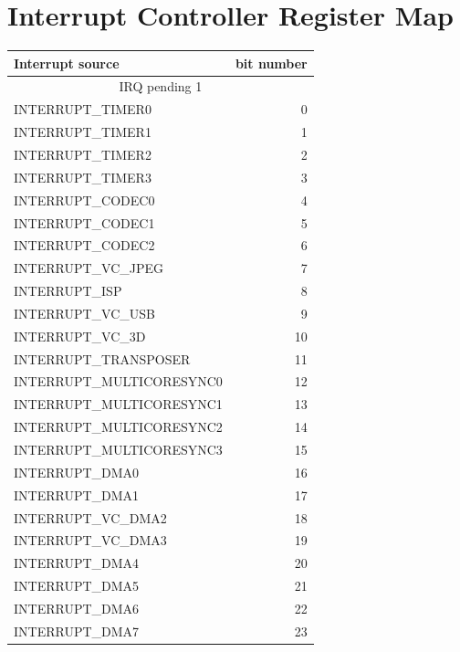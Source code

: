 \documentclass[12pt, svgnames]{book}
\begin{document}
\section{Interrupt Controller Register Map}
\hypertarget{IRQ map}{}
\begin{centering}
	{
		\begin{longtable}{|l | r |}
			\hline
			 Interrupt source	&  bit number\\
			 \hline
			 \multicolumn{2}{|c|}{IRQ pending 1}\\
			 \hline
			 INTERRUPT\_TIMER0               &  0\\
			 INTERRUPT\_TIMER1               &  1\\
			 INTERRUPT\_TIMER2               &  2\\
			 INTERRUPT\_TIMER3               &  3\\
			 INTERRUPT\_CODEC0               &  4\\
			 INTERRUPT\_CODEC1               &  5\\
			 INTERRUPT\_CODEC2               &  6\\
			 INTERRUPT\_VC\_JPEG              &  7\\
			 INTERRUPT\_ISP                  &  8\\
			 INTERRUPT\_VC\_USB               &  9\\
			 INTERRUPT\_VC\_3D                &  10\\
			 INTERRUPT\_TRANSPOSER           &  11\\
			 INTERRUPT\_MULTICORESYNC0       &  12\\
			 INTERRUPT\_MULTICORESYNC1       &  13\\
			 INTERRUPT\_MULTICORESYNC2       &  14\\
			 INTERRUPT\_MULTICORESYNC3       &  15\\
			 INTERRUPT\_DMA0                 &  16\\
			 INTERRUPT\_DMA1                 &  17\\
			 INTERRUPT\_VC\_DMA2              &  18\\
			 INTERRUPT\_VC\_DMA3              &  19\\
			 INTERRUPT\_DMA4                 &  20\\
			 INTERRUPT\_DMA5                 &  21\\
			 INTERRUPT\_DMA6                 &  22\\
			 INTERRUPT\_DMA7                 &  23\\

\end{longtable}}
\end{centering}
\end{document}
